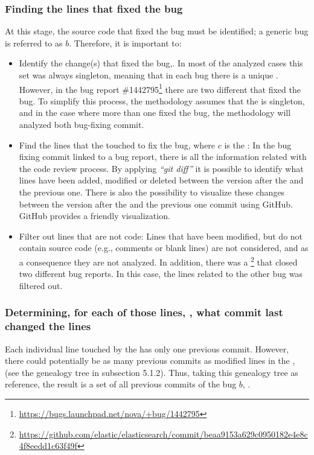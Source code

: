 \documentclass[a4paper, 12pt]{book}
\begin{document}
\subsubsection{Finding the lines that fixed the bug}

At this stage, the source code that fixed the bug must be identified; a generic bug is referred to as $b$. Therefore, it is important to:
	\begin{itemize}
		\item Identify the change(s) that fixed the bug,. In most of the analyzed cases this set was always singleton, meaning that in each bug there is a unique \BFC. However, in the bug report \#1442795\footnote{\url{https://bugs.launchpad.net/nova/+bug/1442795}} there are two different \BFC that fixed the bug. To simplify this process, the methodology assumes that the  is singleton, and in the case where more than one \BFC fixed the bug, the methodology will analyzed both bug-fixing commit.
		\item Find the lines that the  touched to fix the bug,  where $c$ is the \BFC:
	In the bug fixing commit linked to a bug report, there is all the information related with the code review process. By applying \textit{``git diff''} it is possible to identify what lines have been added, modified or deleted between the version after the  and the previous one. There is also the possibility to visualize these changes between the version after the  and the previous one
 commit using GitHub. GitHub provides a friendly visualization.
 		\item Filter out lines that are not code:
		Lines that have been modified, but do not contain source code (e.g., comments or blank lines) are not considered, and as a consequence they are not analyzed. In addition, there was a \BFC\footnote{\url{https://github.com/elastic/elasticsearch/commit/beaa9153a629c0950182e4e8c4f8eedd1c63f49f}} that closed two different bug reports. In this case, the lines related to the other bug was filtered out.	
	\end{itemize}

\subsubsection{Determining, for each of those lines, , what commit last changed the lines}

Each individual line touched by the \BFC has only one previous commit. However, there could potentially be as many previous commits as modified lines in the \BFC, (see the genealogy tree in subsection 5.1.2). Thus, taking this genealogy tree as reference, the result is a set of all previous commits of the bug $b$, .  
\end{document}
